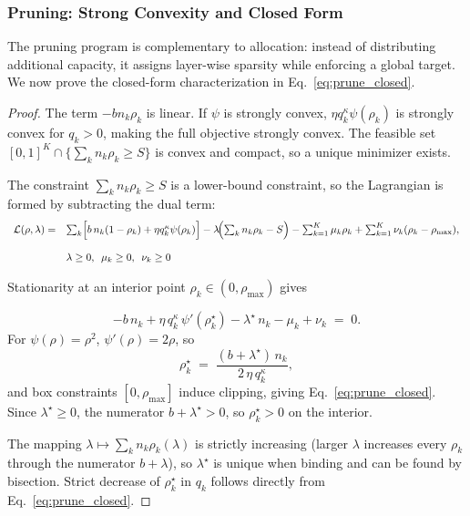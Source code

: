 \documentclass[accepted]{uai2026}%
\theoremstyle{remark}%
\begin{document}
\subsubsection{Pruning: Strong Convexity and Closed Form}
The pruning program is complementary to allocation: instead of distributing
additional capacity, it assigns layer-wise sparsity while enforcing a global
target. We now prove the closed-form characterization in
Eq.~\eqref{eq:prune_closed}.
\begin{proof}
\label{proof:prune}
The term $-bn_k\rho_k$ is linear.
If $\psi$ is strongly convex, $\eta q_k^{\kappa}\psi(\rho_k)$ is strongly
convex for $q_k > 0$, making the full objective strongly convex.
The feasible set $[0,1]^K \cap \{\sum_k n_k\rho_k \ge S\}$ is convex and
compact, so a unique minimizer exists.

The constraint $\sum_k n_k\rho_k \ge S$ is a lower-bound constraint,
so the Lagrangian is formed by subtracting the dual term:
\begin{equation}
\begin{array}{rl}
      \mathcal{L}(\rho,\lambda)=&
  \sum_k
  \Bigl[b\,n_k(1-\rho_k) + \eta q_k^{\kappa}\psi(\rho_k)\Bigr]
  - \lambda\!\Bigl(\sum_k n_k\rho_k - S\Bigr) - \sum_{k=1}^{K} \mu_k \rho_k + \sum_{k=1}^{K} \nu_k (\rho_k - \rho_{\max}),  \\\\
    &\lambda\ge 0, \,\,\, \mu_k \ge 0, \,\,\, \nu_k \ge 0
\end{array}
\label{eq:prune_dual}
\end{equation}


Stationarity at an interior point $\rho_k \in (0,\rho_{\max})$ gives

\[
  -b\,n_k
  + \eta\,q_k^{\kappa}\,\psi'(\rho_k^{\star})
  - \lambda^{\star}\,n_k - \mu_k + \nu_k
  \;=\; 0.
\]
For $\psi(\rho) = \rho^{2}$, $\psi'(\rho) = 2\rho$, so
\[
  \rho_k^{\star}
  \;=\;
  \frac{(b + \lambda^{\star})\,n_k}{2\,\eta\,q_k^{\kappa}},
\]
and box constraints $[0,\rho_{\max}]$ induce clipping, giving Eq.~\eqref{eq:prune_closed}.
Since $\lambda^{\star} \ge 0$, the numerator $b + \lambda^{\star} > 0$,
so $\rho_k^{\star} > 0$ on the interior.

The mapping $\lambda \mapsto \sum_k n_k\rho_k(\lambda)$ is strictly
increasing (larger $\lambda$ increases every $\rho_k$ through the
numerator $b + \lambda$), so $\lambda^{\star}$ is unique when binding
and can be found by bisection.
Strict decrease of $\rho_k^{\star}$ in $q_k$ follows directly
from Eq.~\eqref{eq:prune_closed}.
\end{proof}
\end{document}
